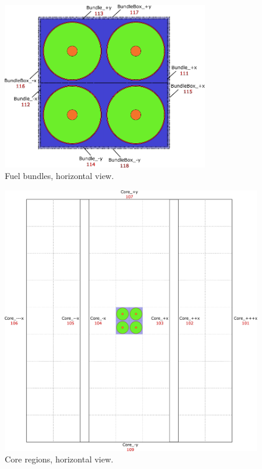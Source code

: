 \documentclass{UWNR_modeling}
\begin{document}
\newpage
\appendix
\begin{figure}[H]
  \centering
  \includegraphics[width=3.5in]{bundle_xy.pdf}
  \caption{Fuel bundles, horizontal view.}
  \label{fig:bundle_xy}
\end{figure}
\begin{figure}[H]
  \centering
  \includegraphics[width=4.5in]{core_xy.pdf}
  \caption{Core regions, horizontal view.}
  \label{fig:core_xy}
\end{figure}
\end{document}
